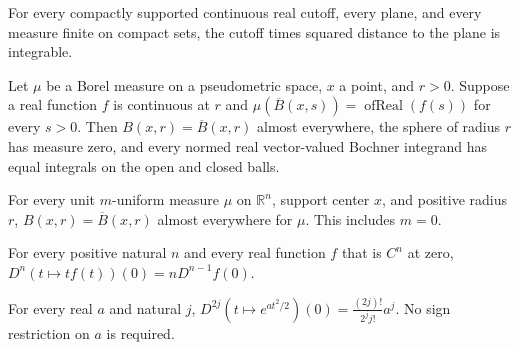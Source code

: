 \begin{lemma}
\label{lem:flatness-energy-integrable}

For every compactly supported continuous real cutoff, every plane, and every measure finite on compact sets, the cutoff times squared distance to the plane is integrable.
\end{lemma}

\begin{lemma}
\label{lem:continuous-ball-profile-boundary}

Let $\mu$ be a Borel measure on a pseudometric space, $x$ a point, and $r>0$. Suppose a real function $f$ is continuous at $r$ and $\mu(\overline B(x,s))=\operatorname{ofReal}(f(s))$ for every $s>0$. Then $B(x,r)=\overline B(x,r)$ almost everywhere, the sphere of radius $r$ has measure zero, and every normed real vector-valued Bochner integrand has equal integrals on the open and closed balls.
\end{lemma}

\begin{lemma}
\label{lem:uniform-ball-boundary}

For every unit $m$-uniform measure $\mu$ on $\mathbb R^n$, support center $x$, and positive radius $r$, $B(x,r)=\overline B(x,r)$ almost everywhere for $\mu$. This includes $m=0$.
\end{lemma}

\begin{lemma}
\label{lem:iterated-derivative-id-product}

For every positive natural $n$ and every real function $f$ that is $C^n$ at zero, $D^n(t\mapsto t f(t))(0)=nD^{n-1}f(0)$.
\end{lemma}

\begin{lemma}
\label{lem:quadratic-exponential-even-derivatives}

For every real $a$ and natural $j$, $D^{2j}(t\mapsto e^{at^2/2})(0)=\frac{(2j)!}{2^j j!}a^j$. No sign restriction on $a$ is required.
\end{lemma}

